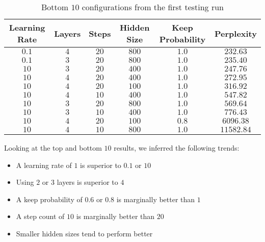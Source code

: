 \documentclass[a4paper]{article}
\begin{document}
\begin{table}[h]
 \caption{Bottom $10$ configurations from the first testing run}
 \label{table}
 \begin{center}
  \begin{tabular}{ccccc|c}
    \hline \hline
    Learning Rate & Layers & Steps & Hidden Size & Keep Probability & Perplexity \\
    \hline
        $0.1$ & $4$ & $20$ & $800$ & $1.0$ & $232.63$ \\
        $0.1$ & $3$ & $20$ & $800$ & $1.0$ & $235.40$ \\
        $10$ & $3$ & $20$ & $400$ & $1.0$ & $247.76$ \\
        $10$ & $4$ & $20$ & $400$ & $1.0$ & $272.95$ \\
        $10$ & $4$ & $20$ & $100$ & $1.0$ & $316.92$ \\
        $10$ & $4$ & $10$ & $400$ & $1.0$ & $547.82$ \\
        $10$ & $3$ & $20$ & $800$ & $1.0$ & $569.64$ \\
        $10$ & $3$ & $10$ & $400$ & $1.0$ & $776.43$ \\
        $10$ & $4$ & $20$ & $100$ & $0.8$ & $6096.38$ \\
        $10$ & $4$ & $10$ & $800$ & $1.0$ & $11582.84$ \\
    \hline
  \end{tabular}
 \end{center}
\end{table}

Looking at the top and bottom $10$ results, we inferred the following trends:

\vspace{0.1in}
\begin{addmargin}[0.5in]{0in}
    \begin{itemize}
    \setlength\itemsep{-0.3em}
        \item A learning rate of $1$ is superior to $0.1$ or $10$
        \item Using $2$ or $3$ layers is superior to $4$
        \item A keep probability of $0.6$ or $0.8$ is marginally better than $1$
        \item A step count of $10$ is marginally better than $20$
        \item Smaller hidden sizes tend to perform better
    \end{itemize}
\end{addmargin}
\vspace{0.1in}
\end{document}
